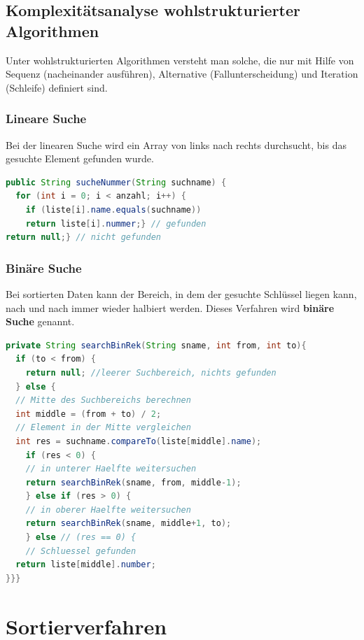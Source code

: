 \documentclass{scrreprt}
\begin{document}
\section{Komplexitätsanalyse wohlstrukturierter Algorithmen}
Unter wohlstrukturierten Algorithmen versteht man solche, die nur mit Hilfe von Sequenz (nacheinander ausführen),
Alternative (Fallunterscheidung) und Iteration (Schleife) definiert sind.
\subsection{Lineare Suche}
Bei der linearen Suche wird ein Array von links nach rechts durchsucht, bis das gesuchte Element gefunden wurde.
\\\begin{lstlisting}[language=Java]
public String sucheNummer(String suchname) {
  for (int i = 0; i < anzahl; i++) {
    if (liste[i].name.equals(suchname))
    return liste[i].nummer;} // gefunden
return null;} // nicht gefunden
\end{lstlisting}
\subsection{Binäre Suche}
Bei sortierten Daten kann der Bereich, in dem der gesuchte Schlüssel liegen kann, nach und nach immer wieder 
halbiert werden. Dieses Verfahren wird \textbf{binäre Suche} genannt.
\\\begin{lstlisting}[language=Java]
private String searchBinRek(String sname, int from, int to){
  if (to < from) {
    return null; //leerer Suchbereich, nichts gefunden
  } else {
  // Mitte des Suchbereichs berechnen
  int middle = (from + to) / 2;
  // Element in der Mitte vergleichen
  int res = suchname.compareTo(liste[middle].name);
    if (res < 0) {
    // in unterer Haelfte weitersuchen
    return searchBinRek(sname, from, middle-1);
    } else if (res > 0) {
    // in oberer Haelfte weitersuchen
    return searchBinRek(sname, middle+1, to);
    } else // (res == 0) {
    // Schluessel gefunden
  return liste[middle].number;
}}}
\end{lstlisting}

\chapter{Sortierverfahren}
\end{document}

